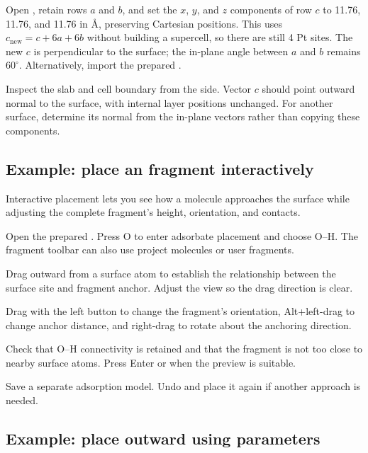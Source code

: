 Open , retain rows $a$ and $b$, and set the $x$, $y$, and $z$ components of row $c$ to 11.76, 11.76, and 11.76 in \AA, preserving Cartesian positions. This uses $c_{\mathrm{new}}=c+6a+6b$ without building a supercell, so there are still 4 Pt sites. The new $c$ is perpendicular to the surface; the in-plane angle between $a$ and $b$ remains $60^\circ$. Alternatively, import the prepared .

Inspect the slab and cell boundary from the side. Vector $c$ should point outward normal to the surface, with internal layer positions unchanged. For another surface, determine its normal from the in-plane vectors rather than copying these components.

\subsection{Example: place an  fragment interactively}

Interactive placement lets you see how a molecule approaches the surface while adjusting the complete fragment's height, orientation, and contacts.

\begin{steps}
  \item Open the prepared . Press O to enter adsorbate placement and choose O--H. The fragment toolbar can also use project molecules or user fragments.
  \item Drag outward from a surface atom to establish the relationship between the surface site and fragment anchor. Adjust the view so the drag direction is clear.
  \item Drag with the left button to change the fragment's orientation, Alt+left-drag to change anchor distance, and right-drag to rotate about the anchoring direction.
  \item Check that O--H connectivity is retained and that the fragment is not too close to nearby surface atoms. Press Enter or  when the preview is suitable.
  \item Save a separate adsorption model. Undo and place it again if another approach is needed.
\end{steps}

\subsection{Example: place  outward using parameters}

